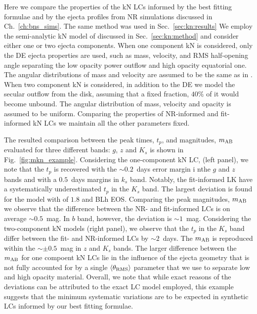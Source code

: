 Here we compare the properties of the \ac{kN} \acp{LC} informed by the best fitting 
formulae and by the ejecta profiles from \ac{NR} simulations discussed in Ch.~\ref{ch:bns_sims}.
The same method was used in Sec.~\ref{sec:kn:results}
We employ the semi-analytic \ac{kN} model of \citet{Perego:2017wtu} discussed in 
Sec.~\ref{sec:kn:method} and consider either one or two ejecta components.
When one component \ac{kN} is considered, only the \ac{DE} ejecta properties are used, 
such as mass, velocity, and \ac{RMS} half-opening angle separating the low opacity 
power outflow and high opacity equatorial one. The angular distributions of mass and velocity 
are assumed to be the same as in \citet{Perego:2017wtu}.
When two component \ac{kN} is considered, in addition to the \ac{DE} we model the 
secular outflow from the disk, assuming that a fixed fraction, $40\%$ of it would 
become unbound. The angular distribution of mass, velocity and opacity
is assumed to be uniform. 
Comparing the properties of \ac{NR}-informed and fit-informed \ac{kN} \acp{LC} we 
maintain all the other parameters fixed.

The resulted comparison between the peak times, $t_p$, and magnitudes, $m_{\rm AB}$ 
evaluated for three different bands: $g$, $z$ and $K_s$ 
is shown in Fig.~\ref{fig:mkn_example}.
Considering the one-component \ac{kN} \ac{LC}, (left panel), we note that the $t_p$ is 
recovered with the ${\sim}0.2$~days error margin i nthe $g$ and $z$ bands and with a 
$0.5$~days margins in $k_s$ band. Notably, the fit-informed \ac{LK} have a systematically
underestimated $t_p$ in the $K_s$ band. 
The largest deviation is found for the model with \mr{} of $1.8$ and BLh \ac{EOS}.
Comparing the peak magnitudes, $m_{\rm AB}$ we observe that the difference 
between the \ac{NR}- and fit-informed \acp{LC} is on average ${\sim}0.5$~mag. 
In $b$ band, however, the deviation is ${\sim}1$~mag.
Considering the two-component \ac{kN} models (right panel), we observe that the 
$t_p$ in the $K_s$ band differ between the fit- and \ac{NR}-informed \acp{LC} by 
${\sim}2$~days. The $m_{\rm AB}$ is reproduced within the ${\sim}\pm 0.5$~mag in $z$ 
and $K_s$ bands.
The larger difference between the $m_{\rm AB}$ for one compoent \ac{kN} \acp{LC} lie 
in the influence of the ejecta geometry that is not fully accounted for by a single 
$\langle\theta_{\rm RMS}\rangle$ parameter that we use to separate low and high opacity material. 
Overall, we note that while exact reasons of the deviations can be attributed to 
the exact \ac{LC} model employed, this example suggests that the minimum systematic 
variations are to be expected in synthetic \acp{LC} informed by our best fitting formulae.


